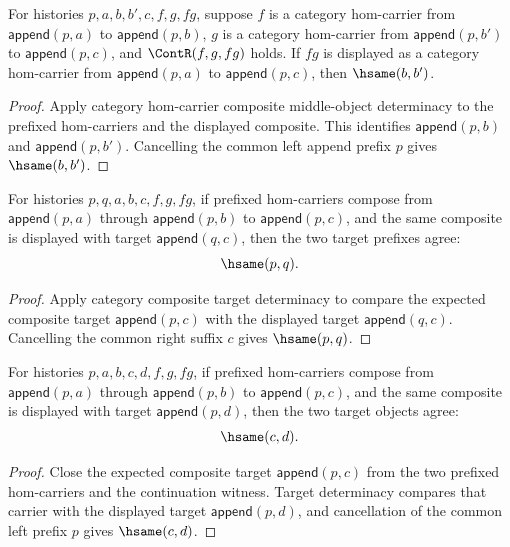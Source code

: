\begin{theorem}
\label{thm:functor-prefix-hom-carrier-comp-middle-object-deterministic}
For histories $p,a,b,b',c,f,g,fg$, suppose $f$ is a category hom-carrier from
$\mathsf{append}(p,a)$ to $\mathsf{append}(p,b)$, $g$ is a category
hom-carrier from $\mathsf{append}(p,b')$ to $\mathsf{append}(p,c)$, and
$\ContR(f,g,fg)$ holds. If $fg$ is displayed as a category hom-carrier from
$\mathsf{append}(p,a)$ to $\mathsf{append}(p,c)$, then $\hsame(b,b')$.
\end{theorem}
\begin{proof}
Apply category hom-carrier composite middle-object determinacy to the prefixed
hom-carriers and the displayed composite. This identifies
$\mathsf{append}(p,b)$ and $\mathsf{append}(p,b')$. Cancelling the common left
append prefix $p$ gives $\hsame(b,b')$.
\end{proof}

\begin{theorem}
\label{thm:functor-prefix-hom-carrier-comp-target-prefix-deterministic}
For histories $p,q,a,b,c,f,g,fg$, if prefixed hom-carriers compose from
$\mathsf{append}(p,a)$ through $\mathsf{append}(p,b)$ to
$\mathsf{append}(p,c)$, and the same composite is displayed with target
$\mathsf{append}(q,c)$, then the two target prefixes agree:
$$
\hsame(p,q).
$$
\end{theorem}
\begin{proof}
Apply category composite target determinacy to compare the expected composite
target $\mathsf{append}(p,c)$ with the displayed target
$\mathsf{append}(q,c)$. Cancelling the common right suffix $c$ gives
$\hsame(p,q)$.
\end{proof}

\begin{theorem}
\label{thm:functor-prefix-hom-carrier-comp-target-object-deterministic}
For histories $p,a,b,c,d,f,g,fg$, if prefixed hom-carriers compose from
$\mathsf{append}(p,a)$ through $\mathsf{append}(p,b)$ to
$\mathsf{append}(p,c)$, and the same composite is displayed with target
$\mathsf{append}(p,d)$, then the two target objects agree:
$$
\hsame(c,d).
$$
\end{theorem}
\begin{proof}
Close the expected composite target $\mathsf{append}(p,c)$ from the two
prefixed hom-carriers and the continuation witness. Target determinacy compares
that carrier with the displayed target $\mathsf{append}(p,d)$, and cancellation
of the common left prefix $p$ gives $\hsame(c,d)$.
\end{proof}

